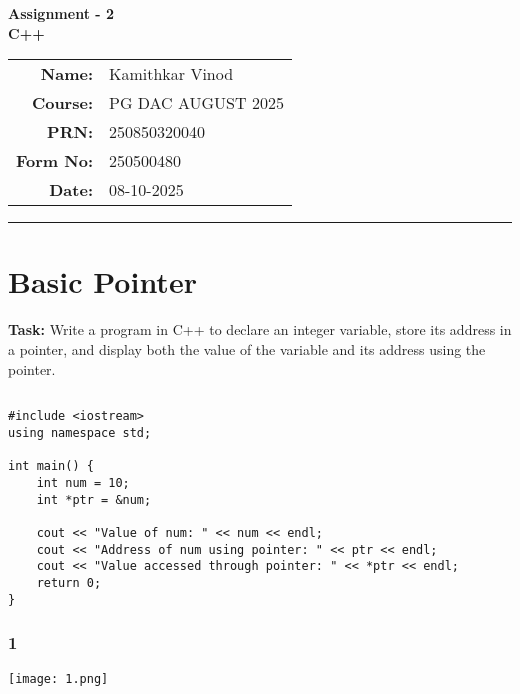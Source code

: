 \documentclass[12pt,a4paper]{article}
\begin{document}
\begin{center}
    \LARGE \textbf{Assignment - 2} \\[0.5cm]
    \Large \textbf{C++} \\[1cm]

    \begin{tabular}{rl}
        \textbf{Name:} & Kamithkar Vinod \\
        \textbf{Course:} & PG DAC AUGUST 2025 \\
        \textbf{PRN:} & 250850320040 \\
        \textbf{Form No:} & 250500480 \\
        \textbf{Date:} & 08-10-2025 \\
    \end{tabular}
\end{center}

\vspace{1cm}
\hrule
\vspace{0.5cm}

\section{Basic Pointer }
\textbf{Task:} Write a program in C++ to declare an integer variable, store its address in a pointer, and display both the value of the variable and its address using the pointer.


\subsection{}
\begin{lstlisting}
#include <iostream>
using namespace std;

int main() {
    int num = 10;
    int *ptr = &num;

    cout << "Value of num: " << num << endl;
    cout << "Address of num using pointer: " << ptr << endl;
    cout << "Value accessed through pointer: " << *ptr << endl;
    return 0;
}

\end{lstlisting}

\subsubsection{1}
\begin{center}
    \texttt{[image: 1.png]}
\end{center}


\end{document}
